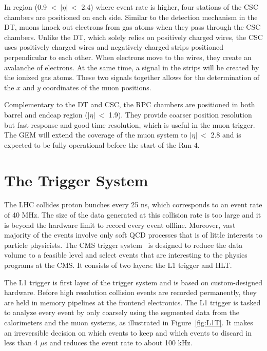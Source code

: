 In region (0.9 $<~|\eta|~<$ 2.4) where event rate is higher, four stations of the \ac{CSC} chambers are positioned on each side. Similar to the detection mechanism in the \ac{DT}, muons knock out electrons from gas atoms when they pass through the \ac{CSC} chambers. Unlike the \ac{DT}, which solely relies on positively charged wires, the \ac{CSC} uses positively charged wires and negatively charged strips positioned perpendicular to each other. When electrons move to the wires, they create an avalanche of electrons. At the same time, a signal in the strips will be created by the ionized gas atoms. These two signals together allows for the determination of the $x$ and $y$ coordinates of the muon positions. 

Complementary to the \ac{DT} and \ac{CSC}, the \ac{RPC} chambers are positioned in both barrel and endcap region ($|\eta|~<$ 1.9). They provide coarser position resolution but fast response and good time resolution, which is useful in the muon trigger. The \ac{GEM} will extend the coverage of the muon system to $|\eta|~<$ 2.8 and is expected to be fully operational before the start of the Run-4. 

\section{The Trigger System}
\label{sec:TrigSys}
 
The \ac{LHC} collides proton bunches every 25 ns, which corresponds to an event rate of 40 MHz. The size of the data generated at this collision rate is too large and it is beyond the hardware limit to record every event offline. Moreover, vast majority of the events involve only soft \ac{QCD} processes that is of little interests to particle physicists. The \ac{CMS} trigger system~\cite{CMS:2016ngn} is designed to reduce the data volume to a feasible level and select events that are interesting to the physics programs at the \ac{CMS}. It consists of two layers: the \ac{L1} trigger and \ac{HLT}.

The \ac{L1} trigger is first layer of the trigger system and is based on custom-designed hardware. Before high resolution collision events are recorded permanently, they are held in memory pipelines at the frontend electronics. The \ac{L1} trigger is tasked to analyze every event by only coarsely using the segmented data from the calorimeters and the muon systems, as illustrated in Figure~\ref{fig:L1T}. It makes an irreversible decision on which events to keep and which events to discard in less than 4 $\mu$s and reduces the event rate to about 100 kHz.

